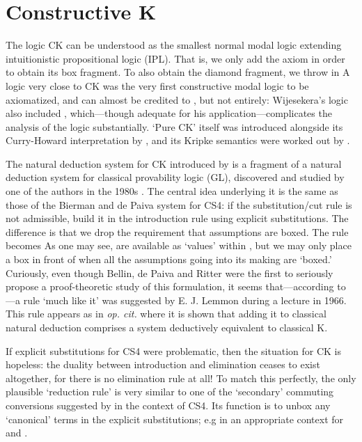 \documentclass[a4paper]{amsart}
\begin{document}
\section{Constructive \textsf{K}}
  \label{sec:ck}

The logic \textsf{CK} can be understood as the smallest normal
modal logic extending intuitionistic propositional logic
(\textsf{IPL}). That is, we only add the axiom  in order to obtain its box fragment. To also obtain the
diamond fragment, we throw in  A logic very close to \textsf{CK} was the very first
constructive modal logic to be axiomatized, and can almost be
credited to \cite{Wijesekera1990}, but not entirely: Wijesekera's
logic also included ,
which---though adequate for his application---complicates the
analysis of the logic substantially. `Pure \textsf{CK}' itself was
introduced alongside its Curry-Howard interpretation by
\cite{Bellin2001}, and its Kripke semantics were worked out by
\cite{Mendler2005}.

The natural deduction system for \textsf{CK} introduced by
\cite{Bellin2001} is a fragment of a natural deduction system for
classical provability logic (\textsf{GL}), discovered and studied
by one of the authors in the 1980s \citep{Bellin1985}. The central
idea underlying it is the same as those of the Bierman and de
Paiva system for \textsf{CS4}: if the substitution/cut rule is not
admissible, build it in the introduction rule using explicit
substitutions. The difference is that we drop the requirement that
assumptions are boxed. The rule becomes  As one may see,  are available
as `values' within , but we may only place a box in front of
 when all the assumptions going into its making are
`boxed.' Curiously, even though Bellin, de Paiva and Ritter
were the first to seriously propose a proof-theoretic study of
this formulation, it seems that---according to
\cite{Satre1972}---a rule `much like it' was suggested by E.  J.
Lemmon during a lecture in 1966. This rule appears as 
in \emph{op. cit.} where it is shown that adding it to classical
natural deduction comprises a system deductively equivalent to
classical \textsf{K}.

If explicit substitutions for \textsf{CS4} were problematic, then
the situation for \textsf{CK} is hopeless: the duality between
introduction and elimination ceases to exist altogether, for there
is no elimination rule at all! To match this perfectly, the only
plausible `reduction rule' is very similar to one of the
`secondary' commuting conversions suggested by
\cite{Goubault-Larrecq1996} in the context of \textsf{CS4}. Its
function is to unbox any `canonical' terms in the explicit
substitutions; e.g  in an appropriate context for  and .
\end{document}
